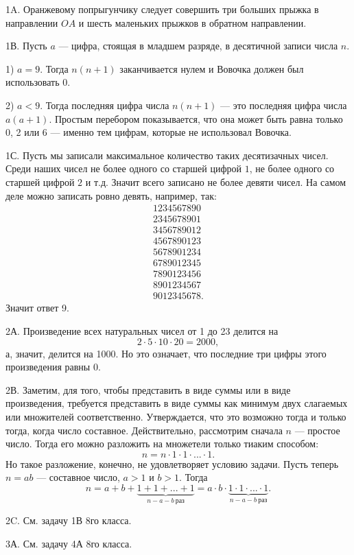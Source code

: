 \documentclass[12pt]{amsart}
\theoremstyle{definition}
\theoremstyle{remark}
\theoremstyle{plain}
\begin{document}
1A. Оранжевому попрыгунчику следует совершить три больших прыжка в направлении $OA$ и шесть маленьких прыжков в обратном направлении.

1В. Пусть $a$ --- цифра, стоящая в младшем разряде, в десятичной записи числа $n$.

1) $a=9$. Тогда $n(n+1)$ заканчивается нулем и Вовочка должен был использовать 0.

2) $a<9$. Тогда последняя цифра числа $n(n+1)$ --- это последняя цифра числа $a(a+1)$. Простым перебором показывается, что она может быть равна только 0, 2 или 6 --- именно тем цифрам, которые не использовал Вовочка.

1С. Пусть мы записали максимальное количество таких десятизачных чисел. Среди наших чисел не более одного со старшей цифрой $1$, не более одного со старшей цифрой $2$ и т.д. Значит всего записано не более девяти чисел. На самом деле можно записать ровно девять, например, так:
$$\begin{array}{l}
1234567890\\
2345678901\\
3456789012\\
4567890123\\
5678901234\\
6789012345\\
7890123456\\
8901234567\\
9012345678.
\end{array}$$
Значит ответ 9.

2А. Произведение всех натуральных чисел от 1 до 23 делится на
$$
2\cdot5\cdot 10\cdot20=2000,
$$
а, значит, делится на 1000. Но это означает, что последние три цифры этого произведения равны 0.

2В. Заметим, для того, чтобы представить в виде суммы или в виде произведения, требуется представить в виде суммы как минимум двух слагаемых или множителей соответственно. Утверждается, что это возможно тогда и только тогда, когда число составное. Действительно, рассмотрим сначала $n$ --- простое число. Тогда его можно разложить на множетели только тиаким способом:
$$
n=n\cdot1\cdot1\cdot ...\cdot1.
$$
Но такое разложение, конечно, не удовлетворяет условию задачи. Пусть теперь $n=ab$ --- составное число, $a>1$ и $b>1$. Тогда
$$
n=a+b+\underbrace{1+1+...+1}_{n-a-b\ \text{раз}}=a\cdot b\cdot\underbrace{1\cdot1\cdot...\cdot 1}_{n-a-b\ \text{раз}}.
$$

2C. См. задачу 1В 8го класса.

3А. См. задачу 4А 8го класса.
\end{document}
